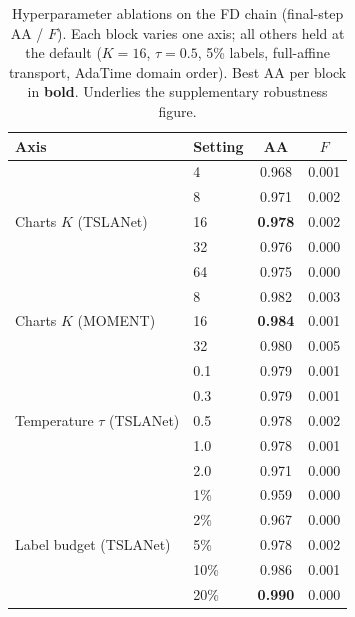 \begin{table}[t]
\centering
\caption{Hyperparameter ablations on the FD chain (final-step AA / $F$).
Each block varies one axis; all others held at the default ($K{=}16$,
$\tau{=}0.5$, 5\% labels, full-affine transport, AdaTime domain order). Best AA
per block in \textbf{bold}. Underlies the supplementary robustness figure.}
\label{tab:hparams}
\small
\begin{tabular}{ll cc}
\toprule
Axis & Setting & AA & $F$\\
\midrule
\multirow{5}{*}{Charts $K$ (TSLANet)}
 & 4  & 0.968 & 0.001\\
 & 8  & 0.971 & 0.002\\
 & 16 & \textbf{0.978} & 0.002\\
 & 32 & 0.976 & 0.000\\
 & 64 & 0.975 & 0.000\\
\cmidrule(lr){1-4}
\multirow{3}{*}{Charts $K$ (MOMENT)}
 & 8  & 0.982 & 0.003\\
 & 16 & \textbf{0.984} & 0.001\\
 & 32 & 0.980 & 0.005\\
\cmidrule(lr){1-4}
\multirow{5}{*}{Temperature $\tau$ (TSLANet)}
 & 0.1 & 0.979 & 0.001\\
 & 0.3 & 0.979 & 0.001\\
 & 0.5 & 0.978 & 0.002\\
 & 1.0 & 0.978 & 0.001\\
 & 2.0 & 0.971 & 0.000\\
\cmidrule(lr){1-4}
\multirow{5}{*}{Label budget (TSLANet)}
 & 1\%  & 0.959 & 0.000\\
 & 2\%  & 0.967 & 0.000\\
 & 5\%  & 0.978 & 0.002\\
 & 10\% & 0.986 & 0.001\\
 & 20\% & \textbf{0.990} & 0.000\\

\end{tabular}
\end{table}
